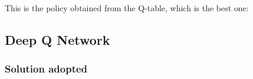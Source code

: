 \documentclass{article}
\begin{document}
This is the policy obtained from the Q-table, which is the best one:
\begin{center}
    \centering
\end{center}

\subsection{Deep Q Network}

\subsubsection{Solution adopted}
\end{document}
